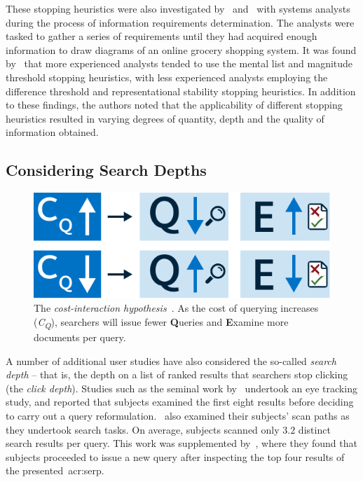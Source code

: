 These stopping heuristics were also investigated by~\cite{browne2004stopping_rules} and~\cite{pitts2004stopping_rules} with systems analysts during the process of information requirements determination. The analysts were tasked to gather a series of requirements until they had acquired enough information to draw diagrams of an online grocery shopping system. It was found by~\cite{browne2004stopping_rules} that more experienced analysts tended to use the mental list and magnitude threshold stopping heuristics, with less experienced analysts employing the difference threshold and representational stability stopping heuristics. In addition to these findings, the authors noted that the applicability of different stopping heuristics resulted in varying degrees of quantity, depth and the quality of information obtained.

\subsection{Considering Search Depths}\label{sec:stopping_background:user_studies:depths}
\begin{figure}
    \begin{center}
    \vspace*{-7mm}
    \includegraphics[width=1\textwidth]{figures/ch3-query-cost.pdf}
    \end{center}
    \vspace*{-4mm}
    \caption[The cost-interaction hypothesis]{The \emph{cost-interaction hypothesis}~\citep{azzopardi2011economics}. As the cost of querying increases (\emph{C\textsubscript{Q}}), searchers will issue fewer \textbf{Q}ueries and \textbf{E}xamine more documents per query.}
    \label{fig:query_cost}
\end{figure}

A number of additional user studies have also considered the so-called \emph{search depth} -- that is, the depth on a list of ranked results that searchers stop clicking (the \emph{click depth}). Studies such as the seminal work by~\cite{cutrell2007eye_tracking} undertook an eye tracking study, and reported that subjects examined the first eight results before deciding to carry out a query reformulation.~\cite{lorigo2008eye_tracking} also examined their subjects' scan paths as they undertook search tasks. On average, subjects scanned only $3.2$ distinct search results per query. This work was supplemented by~\cite{huang2011no_clicks}, where they found that subjects proceeded to issue a new query after inspecting the top four results of the presented~\gls{acr:serp}.

